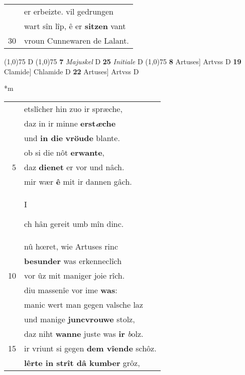 \documentclass[8pt,a4paper,notitlepage]{article}
\begin{document}
\begin{table}[ht]
\begin{minipage}[t]{0.5\linewidth}
\begin{tabular}{rl}
 & er erbeizte. vil gedrungen\\ 
 & wart sîn lîp, ê er \textbf{sitzen} vant\\ 
30 & vroun Cunnewaren de Lalant.\\ 
\end{tabular}
\scriptsize
\line(1,0){75} \newline
D \newline
\line(1,0){75} \newline
\textbf{7} \textit{Majuskel} D  \textbf{25} \textit{Initiale} D  \newline
\line(1,0){75} \newline
\textbf{8} Artuses] Artvss D \textbf{19} Clamide] Chlamide D \textbf{22} Artuses] Artvss D \newline
\end{minipage}
\hspace{0.5cm}
\begin{minipage}[t]{0.5\linewidth}
\small
\begin{center}*m
\end{center}
\begin{tabular}{rl}
 & etslîcher hin zuo ir spræche,\\ 
 & daz in ir minne \textbf{erst\textit{æ}che}\\ 
 & und \textbf{in die} \textbf{vröude} blante.\\ 
 & ob si die nôt \textbf{erwante},\\ 
5 & daz \textbf{dienet} er vor und nâch.\\ 
 & mir wær \textbf{ê} mit ir dannen gâch.\\ 
 & \begin{large}I\end{large}ch hân gereit umb mîn dinc.\\ 
 & nû hœret, wie Artuses rinc\\ 
 & \textbf{besunder} was erkenneclîch\\ 
10 & vor ûz mit maniger joie rîch.\\ 
 & diu massenîe vor ime \textbf{was}:\\ 
 & manic wert man gegen valsche laz\\ 
 & und manige \textbf{juncvrouwe} stolz,\\ 
 & daz niht \textbf{wanne} juste was \textbf{ir} \textit{b}olz.\\ 
15 & ir vriunt si gegen \textbf{dem vîende} schôz.\\ 
 & \textbf{lêrte in strît dâ kumber} grôz,\\ 

\end{tabular}
\end{minipage}
\end{table}
\end{document}

